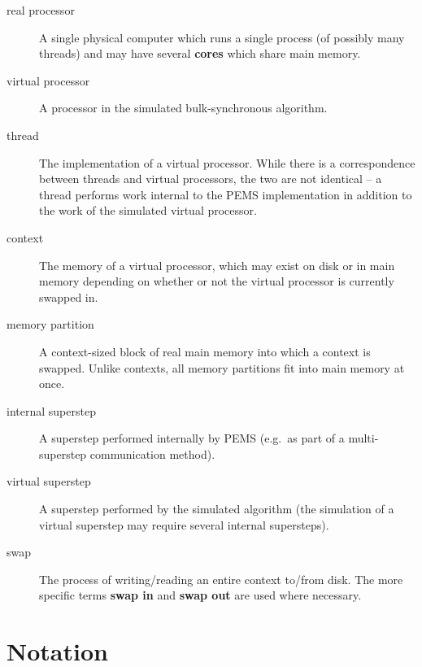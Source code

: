 \documentclass[12pt]{carletoncsthesis}
\begin{document}
\begin{description}
\item[real processor] A single physical computer which runs a single process
(of possibly many threads) and may have several \textbf{cores} which share
main memory.

\item[virtual processor] A processor in the simulated bulk-synchronous
algorithm.

\item[thread] The implementation of a virtual processor.  While there is
a  correspondence between threads and virtual processors, the two are
not identical -- a thread performs work internal to the PEMS implementation
in addition to the work of the simulated virtual processor.

\item[context] The memory of a virtual processor, which may exist on
disk or in main memory depending on whether or not the virtual processor
is currently swapped in.

\item[memory partition] A context-sized block of real main memory into
which a context is swapped.  Unlike contexts, all memory partitions fit into
main memory at once.

\item[internal superstep] A superstep performed internally by PEMS
(e.g.\ as part of a multi-superstep communication method).

\item[virtual superstep] A superstep performed by the simulated algorithm (the
simulation of a virtual superstep may require several internal supersteps).

\item[swap] The process of writing/reading an entire context to/from disk.
The more specific terms \textbf{swap in} and \textbf{swap out} are used
where necessary.
\end{description}

\section{Notation}
\label{notation}
\end{document}
